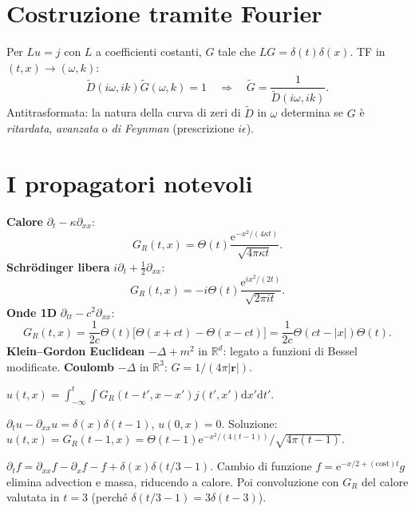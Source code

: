 \documentclass[11pt,a4paper,openany]{book}
\theoremstyle{definition}
\newcommand{\R}{\mathbb{R}}
\newcommand{\dd}{\mathrm{d}}
\newcommand{\eu}{\mathrm{e}}
\begin{document}
\section{Costruzione tramite Fourier}

\begin{teoria}
Per $Lu=j$ con $L$ a coefficienti costanti, $G$ tale che $L G=\delta(t)\delta(x)$. TF in $(t,x)\to(\omega,k)$:
$$\tilde D(i\omega,ik)\tilde G(\omega,k)=1\quad\Rightarrow\quad \tilde G=\frac{1}{\tilde D(i\omega,ik)}.$$
Antitrasformata: la natura della curva di zeri di $\tilde D$ in $\omega$ determina se $G$ \`e \emph{ritardata}, \emph{avanzata} o \emph{di Feynman} (prescrizione $i\epsilon$).
\end{teoria}

\section{I propagatori notevoli}

\begin{formulario}
\textbf{Calore} $\partial_t-\kappa\partial_{xx}$:
$$G_R(t,x)=\Theta(t)\frac{\eu^{-x^2/(4\kappa t)}}{\sqrt{4\pi\kappa t}}.$$
\textbf{Schr\"odinger libera} $i\partial_t+\frac{1}{2}\partial_{xx}$:
$$G_R(t,x)=-i\Theta(t)\frac{\eu^{ix^2/(2t)}}{\sqrt{2\pi i t}}.$$
\textbf{Onde 1D} $\partial_{tt}-c^2\partial_{xx}$:
$$G_R(t,x)=\frac{1}{2c}\Theta(t)\big[\Theta(x+ct)-\Theta(x-ct)\big]=\frac{1}{2c}\Theta(ct-|x|)\Theta(t).$$
\textbf{Klein--Gordon Euclidean} $-\Delta+m^2$ in $\R^d$: legato a funzioni di Bessel modificate.
\textbf{Coulomb} $-\Delta$ in $\R^3$: $G=1/(4\pi|\bm r|)$.
\end{formulario}

\begin{algoritmo}[Soluzione di $Lu=j$ con $G_R$]
$u(t,x)=\int_{-\infty}^t\int G_R(t-t',x-x')j(t',x')\dd x'\dd t'$.
\end{algoritmo}

\begin{esempio}
$\partial_t u-\partial_{xx}u=\delta(x)\delta(t-1)$, $u(0,x)=0$. Soluzione: $u(t,x)=G_R(t-1,x)=\Theta(t-1)\eu^{-x^2/(4(t-1))}/\sqrt{4\pi(t-1)}$.
\end{esempio}

\begin{esempio}[Scritto 08/07/2025, Es. 4]
$\partial_t f=\partial_{xx}f-\partial_x f-f+\delta(x)\delta(t/3-1)$. Cambio di funzione $f=\eu^{-x/2+(\text{cost})t}g$ elimina advection e massa, riducendo a calore. Poi convoluzione con $G_R$ del calore valutata in $t=3$ (perch\'e $\delta(t/3-1)=3\delta(t-3)$).
\end{esempio}
\end{document}
